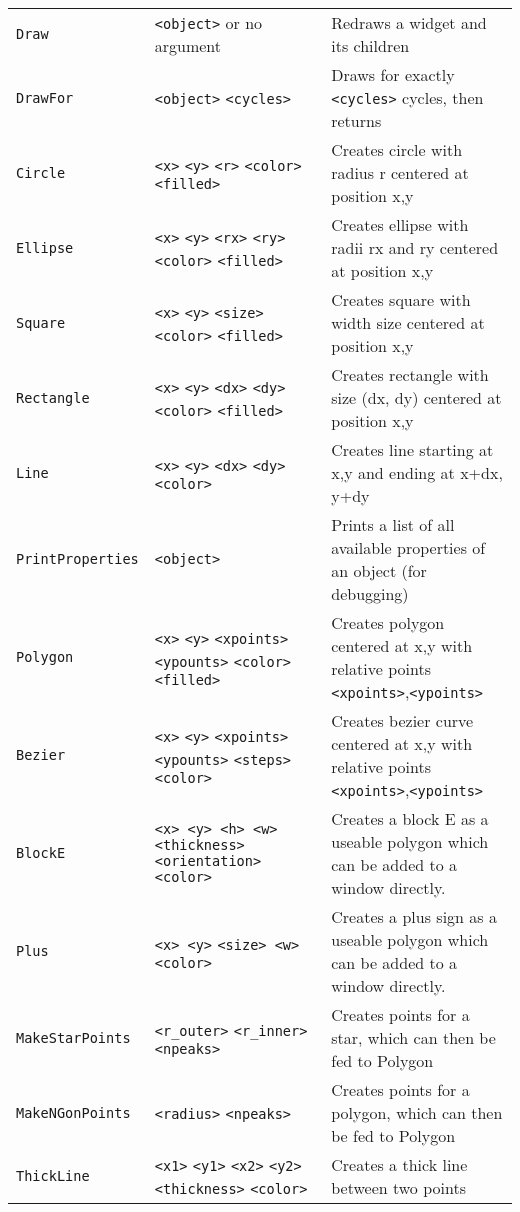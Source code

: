 \begin{longtable}{p{3cm}p{3cm}p{6cm}}
\verb+Draw+ &\verb+<object>+ or no argument &Redraws a widget and its children\\ 
\verb+DrawFor+ &\verb+<object>+ \verb+<cycles>+ &Draws for exactly \verb+<cycles>+ cycles, then returns\\ 
\verb+Circle+ &\verb+<x>+ \verb+<y>+ \verb+<r>+  \verb+<color>+ \verb+<filled>+&Creates circle with radius r centered at position x,y\\ 
\verb+Ellipse+ &\verb+<x>+ \verb+<y>+ \verb+<rx>+ \verb+<ry>+\verb+<color>+ \verb+<filled>+&Creates ellipse with radii rx and ry centered at position x,y\\ 
\verb+Square+ &\verb+<x>+ \verb+<y>+ \verb+<size>+ \verb+<color>+ \verb+<filled>+&Creates square with width size centered at position x,y\\ 
\verb+Rectangle+ &\verb+<x>+ \verb+<y>+ \verb+<dx>+ \verb+<dy>+\verb+<color>+ \verb+<filled>+ &Creates rectangle with size (dx, dy) centered at position x,y\\ 
\verb+Line+ &\verb+<x>+ \verb+<y>+ \verb+<dx>+ \verb+<dy>+  \verb+<color>+ &Creates line starting at x,y and ending at x+dx, y+dy\\ 
\verb+PrintProperties+ &\verb+<object>+ &Prints a list of all available properties of an object (for debugging)\\
\verb+Polygon+ &\verb+<x>+ \verb+<y>+ \verb+<xpoints>+ \verb+<ypounts>+  \verb+<color>+\verb+<filled>+ &Creates polygon centered at x,y with relative points \verb+<xpoints>+,\verb+<ypoints>+\\ 
\verb+Bezier+ &\verb+<x>+ \verb+<y>+ \verb+<xpoints>+ \verb+<ypounts>+ \verb+<steps>+ \verb+<color>+ &Creates bezier curve centered at x,y with relative points \verb+<xpoints>+,\verb+<ypoints>+\\ 
\verb+BlockE+         &\verb+<x> <y> <h> <w>+ \verb+<thickness>+ \verb+<orientation>+ \verb+<color>+ &Creates a block E as a useable polygon which can be added to a window directly.\\ 
\verb+Plus+           &\verb+<x> <y>+ \verb+<size> <w>+ \verb+<color>+
&Creates a plus sign as a useable polygon which can be added to a window directly.\\ 
\verb+MakeStarPoints+ &\verb+<r_outer>+ \verb+<r_inner>+ \verb+<npeaks>+ &Creates points for a star, which can then be fed to Polygon\\ 
\verb+MakeNGonPoints+ &\verb+<radius>+ \verb+<npeaks>+ &Creates points for a polygon, which can then be fed to Polygon\\ 
\verb+ThickLine+ &\verb+<x1>+ \verb+<y1>+ \verb+<x2>+ \verb+<y2>+ \verb+<thickness>+ \verb+<color>+ &Creates a thick line between two points\\ 

\end{longtable}
